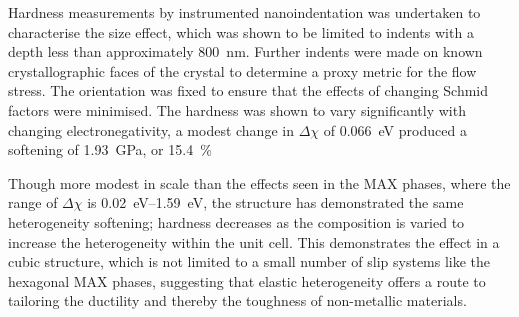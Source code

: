 Hardness measurements by instrumented nanoindentation was undertaken to characterise the size effect, which was shown to be limited to indents with a depth less than approximately \SI{800}{\nano\meter}. Further indents were made on known crystallographic faces of the crystal to determine a proxy metric for the flow stress. The orientation was fixed to ensure that the effects of changing Schmid factors were minimised. The hardness was shown to vary significantly with changing electronegativity, a modest change in $\Delta \chi$ of \SI{0.066}{\electronvolt} produced a softening of \SI{1.93}{\giga\pascal}, or \SI{15.4}{\percent} 

Though more modest in scale than the effects seen in the MAX phases, where the range of $\Delta \chi$ is \SIrange{0.02}{1.59}{\electronvolt}, the  structure has demonstrated the same heterogeneity softening; hardness decreases as the composition is varied to increase the heterogeneity within the unit cell. This demonstrates the effect in a cubic structure, which is not limited to a small number of slip systems like the hexagonal MAX phases, suggesting that elastic heterogeneity offers a route to tailoring the ductility and thereby the toughness of non-metallic materials.
















































